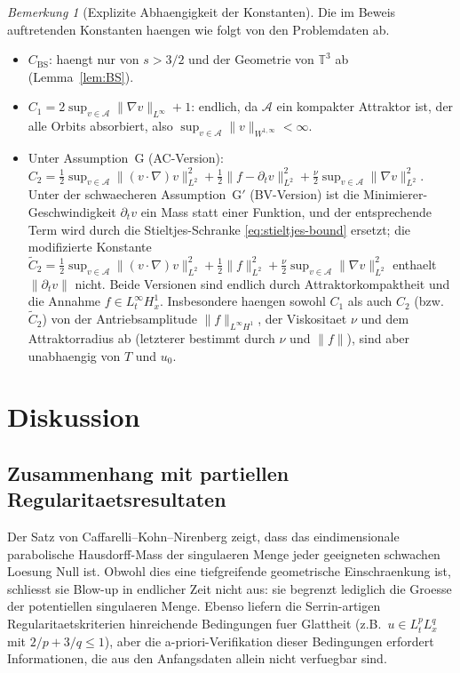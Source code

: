 \documentclass[12pt,a4paper]{article}
\theoremstyle{definition}
\theoremstyle{plain}
\theoremstyle{remark}
\newtheorem{remark}[definition]{Bemerkung}
\begin{document}
\begin{remark}[Explizite Abhaengigkeit der Konstanten]
\label{rem:constants}
Die im Beweis auftretenden Konstanten haengen wie folgt von den Problemdaten ab.
\begin{itemize}
    \item $C_{\mathrm{BS}}$: haengt nur von $s > 3/2$ und der Geometrie von
          $\mathbb{T}^3$ ab (Lemma~\ref{lem:BS}).
    \item $C_1 = 2\sup_{v\in\mathcal{A}}\|\nabla v\|_{L^\infty} + 1$: endlich,
          da $\mathcal{A}$ ein kompakter Attraktor ist, der alle Orbits absorbiert,
          also $\sup_{v\in\mathcal{A}}\|v\|_{W^{1,\infty}} < \infty$.
    \item Unter Assumption~G (AC-Version):
          $C_2 = \tfrac12\sup_{v\in\mathcal{A}}\|(v\cdot\nabla)v\|_{L^2}^2
          + \tfrac12\|f - \partial_t v\|_{L^2}^2
          + \tfrac{\nu}{2}\sup_{v\in\mathcal{A}}\|\nabla v\|_{L^2}^2$.
          Unter der schwaecheren Assumption~G$'$ (BV-Version) ist die
          Minimierer-Geschwindigkeit $\partial_t v$ ein Mass statt einer Funktion,
          und der entsprechende Term wird durch die Stieltjes-Schranke
          \eqref{eq:stieltjes-bound} ersetzt; die modifizierte Konstante
          $\widetilde{C}_2 = \tfrac12\sup_{v\in\mathcal{A}}\|(v\cdot\nabla)v\|_{L^2}^2
          + \tfrac12\|f\|_{L^2}^2 +
          \tfrac{\nu}{2}\sup_{v\in\mathcal{A}}\|\nabla v\|_{L^2}^2$
          enthaelt $\|\partial_t v\|$ nicht.
          Beide Versionen sind endlich durch Attraktorkompaktheit und die Annahme
          $f \in L^\infty_t H^1_x$. Insbesondere haengen sowohl $C_1$ als auch $C_2$
          (bzw.\ $\widetilde{C}_2$)
          von der Antriebsamplitude $\|f\|_{L^\infty H^1}$, der
          Viskositaet $\nu$ und dem Attraktorradius ab (letzterer bestimmt durch
          $\nu$ und $\|f\|$), sind aber unabhaengig von $T$ und $u_0$.
\end{itemize}
\end{remark}

\section{Diskussion}

\subsection{Zusammenhang mit partiellen Regularitaetsresultaten}

Der Satz von Caffarelli--Kohn--Nirenberg \cite{CaffarelliKohnNirenberg1982} zeigt, dass das eindimensionale parabolische Hausdorff-Mass der singulaeren Menge jeder geeigneten schwachen Loesung Null ist. Obwohl dies eine tiefgreifende geometrische Einschraenkung ist, schliesst sie Blow-up in endlicher Zeit nicht aus: sie begrenzt lediglich die Groesse der potentiellen singulaeren Menge. Ebenso liefern die Serrin-artigen Regularitaetskriterien \cite{Leray1934,ConstantinFoias1988} hinreichende Bedingungen fuer Glattheit (z.B.\ $u \in L^p_t L^q_x$ mit $2/p + 3/q \le 1$), aber die a-priori-Verifikation dieser Bedingungen erfordert Informationen, die aus den Anfangsdaten allein nicht verfuegbar sind.
\end{document}
